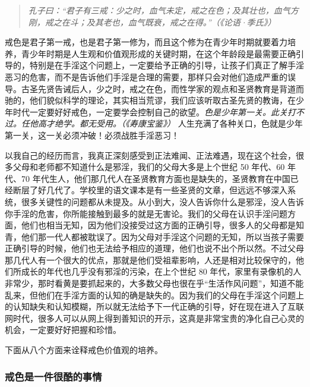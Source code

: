 \begin{quote}\it
    孔子曰：“君子有三戒：少之时，血气未定，戒之在色；及其壮也，血气方刚，戒之在斗；及其老也，血气既衰，戒之在得。”（《论语·季氏》）
\end{quote}

戒色是君子第一戒，也是君子第一修为，而且这个修为在青少年时期就要着力培养，青少年时期是人生观和价值观形成的关键时期，在这个年龄段是最需要正确引导的，特别是在手淫这个问题上，一定要给予正确的引导，让孩子们真正了解手淫恶习的危害，而不是告诉他们手淫是合理的需要，那样只会对他们造成严重的误导。古圣先贤告诫后人，少之时，戒之在色，而性学家的观点和圣贤教育是背道而驰的，他们貌似科学的理论，其实相当荒谬，我们应该听取古圣先贤的教诲，在少年时代一定要好好戒色，一定要学会控制自己的欲望。\textit{色是少年第一关。此关打不过。任他高才绝学。都无受用。（《寿康宝鉴》）} 人生充满了各种关口，色就是少年第一关，这一关必须冲破！必须战胜手淫恶习！

以我自己的经历而言，我真正深刻感受到正法难闻、正法难遇，现在这个社会，很多父母和老师都不知道什么是邪淫，我们的父母大多是上个世纪 50 年代、60 年代、70 年代生人，他们那几代人在圣贤教育方面也是缺失的，圣贤教育在中国已经断层了好几代了。学校里的语文课本是有一些圣贤的文章，但远远不够深入系统，很多关键性的问题都从未提及。从小到大，没人告诉你什么是邪淫，没人告诉你手淫的危害，你所能接触到最多的就是无害论。我们的父母在认识手淫问题方面，他们也相当无知，因为他们没接受过这方面的正确引导，很多人的父母都是知青，他们那一代人都被耽误了。因为父母对手淫这个问题的无知，所以当孩子需要正确引导的时候，他们也无法给予相应的道理，他们也说不出个所以然。不过父母那几代人有一个很大的优点，那就是他们受祖辈影响，人还是相对比较保守的，他们所成长的年代也几乎没有邪淫的污染，在上个世纪 80 年代，家里有录像机的人非常少，那时看黄是要抓起来的，大多数父母也很在乎“生活作风问题”，知道不能乱来，但他们在手淫方面的认知的确是缺失的。因为我们的父母在手淫这个问题上的认知缺失和认知模糊，所以就无法给予下一代正确的引导，好在现在进入了互联网时代，很多人可以从网上得到善知识的开示，这真是非常宝贵的净化自己心灵的机会，一定要好好把握和珍惜。

下面从八个方面来诠释戒色价值观的培养。

\subsubsection{戒色是一件很酷的事情}

